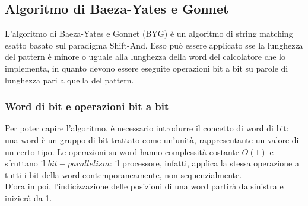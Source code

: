 \subsection*{Algoritmo di Baeza-Yates e Gonnet}
L'algoritmo di Baeza-Yates e Gonnet (BYG) è un algoritmo di string matching esatto basato sul paradigma Shift-And.
Esso può essere applicato sse la lunghezza del pattern è minore o uguale alla lunghezza della word del calcolatore che lo implementa, in quanto devono essere eseguite operazioni bit a bit su parole di lunghezza pari a quella del pattern.

\subsubsection{Word di bit e operazioni bit a bit}
Per poter capire l'algoritmo, è necessario introdurre il concetto di word di bit: una word è un gruppo di bit trattato come un'unità, rappresentante un valore di un certo tipo.
Le operazioni su word hanno complessità costante $O(1)$ e sfruttano il $bit-parallelism$: il processore, infatti, applica la stessa operazione a tutti i bit della word contemporaneamente, non sequenzialmente.\\
D'ora in poi, l'indicizzazione delle posizioni di una word partirà da sinistra e inizierà da 1.

